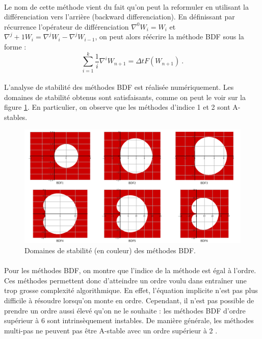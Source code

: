     \paragraph{}
    Le nom de cette méthode vient du fait qu'on peut la reformuler en utilisant la différenciation vers l'arrière (backward differenciation).
    En définissant par récurrence l'opérateur de différenciation $\nabla^0W_i = W_i$ et $\nabla^j+1W_i = \nabla^jW_i - \nabla^jW_{i-1}$, on peut alors réécrire la méthode BDF sous la forme :
    \[\sum_{i=1}^k\frac{1}{i}\nabla^iW_{n+1} = \Delta tF\left(W_{n+1}\right)\ .\]

    \paragraph{}
    L'analyse de stabilité des méthodes BDF est réalisée numériquement.
    Les domaines de stabilité obtenus sont satisfaisants, comme on peut le voir sur la figure \ref{fig:bdf_stab}.
    En particulier, on observe que les méthodes d'indice 1 et 2 sont A-stables.

    \begin{figure}
      \centering
      \includegraphics[width=\textwidth]{images/bdf_stab.png}
      \caption{Domaines de stabilité (en couleur) des méthodes BDF.}
      \label{fig:bdf_stab}
    \end{figure}

    \paragraph{}
    Pour les méthodes BDF, on montre que l'indice de la méthode est égal à l'ordre.
    Ces méthodes permettent donc d'atteindre un ordre voulu dans entraîner une trop grosse complexité algorithmique.
    En effet, l'équation implicite n'est pas plus difficile à résoudre lorsqu'on monte en ordre.
    Cependant, il n'est pas possible de prendre un ordre aussi élevé qu'on ne le souhaite : les méthodes BDF d'ordre supérieur à 6 sont intrinsèquement instables.
    De manière générale, les méthodes multi-pas ne peuvent pas être A-stable avec un ordre supérieur à 2 \cite{HairerWanner1996}.


